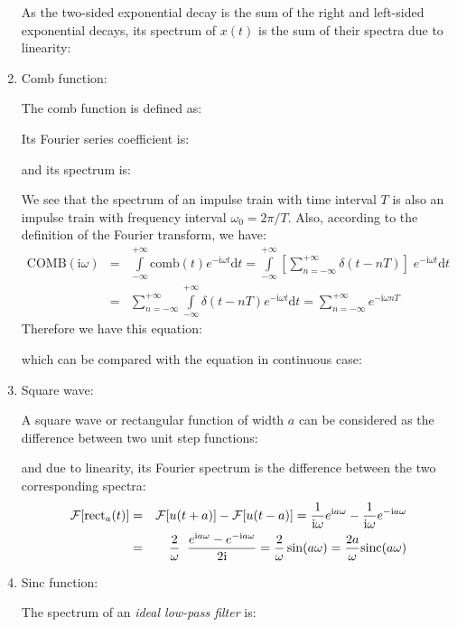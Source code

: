 \begin{enumerate}
	As the two-sided exponential decay is the sum of the right and left-sided 
	exponential decays, its spectrum of $x(t)$ is the sum of their spectra due 
	to linearity:
	
	
	\item Comb function:
	
	The comb function is defined as:
	
	Its Fourier series coefficient is:
	
	and its spectrum is:
	
	We see that the spectrum of an impulse train with time interval $T$ is also an impulse train with frequency interval $\omega_0=2\pi/T$. Also, according to the definition of the Fourier transform, we have:
	\begin{eqnarray}
		\text{COMB}(\mathrm{i}\omega) &=& \int\limits_{-\infty}^{+\infty} \text{comb}(t)  e^{-\mathrm{i}\omega t} \mathrm{d}t 
	 = \int\limits_{-\infty}^{+\infty} \left[\sum_{n=-\infty}^{+\infty} \delta(t-nT)\right]\;
	 e^{-\mathrm{i}\omega t} \mathrm{d}t
		\nonumber \\
	 &=& \sum_{n=-\infty}^{+\infty} \int\limits_{-\infty}^{+\infty} \delta(t-nT)
	 e^{-\mathrm{i}\omega t} \mathrm{d}t
	 = \sum_{n=-\infty}^{+\infty} e^{-\mathrm{i}\omega nT}
		\nonumber
	\end{eqnarray}
	Therefore we have this equation:
	
	which can be compared with the equation in continuous case:
	
	
	
	\item Square wave:
	
	A square wave or rectangular function of width $a$ can be considered as the  difference between two unit step functions:
	
	and due to linearity, its Fourier spectrum is the difference between 
	the two corresponding spectra:
	\begin{eqnarray}
	{\cal F}[\text{rect}_a(t)]&=&{\cal F}[u(t+a)]-{\cal F}[u(t-a)]
		=\frac{1}{\mathrm{i}\omega}e^{\mathrm{i}a\omega}-\frac{1}{\mathrm{i}\omega}e^{-\mathrm{i}a\omega}
		\nonumber \\
	 &=& \frac{2}{\omega}\;\;\frac{e^{\mathrm{i}a\omega}-e^{-\mathrm{i}a\omega}}{2\mathrm{i}}=\frac{2}{\omega}\sin(a\omega)=\frac{2a}{\omega}\mathrm{sinc}(a\omega)
		\nonumber
	\end{eqnarray}
	
	\item Sinc function:
	
	The spectrum of an {\em ideal low-pass filter} is:
	

\end{enumerate}
